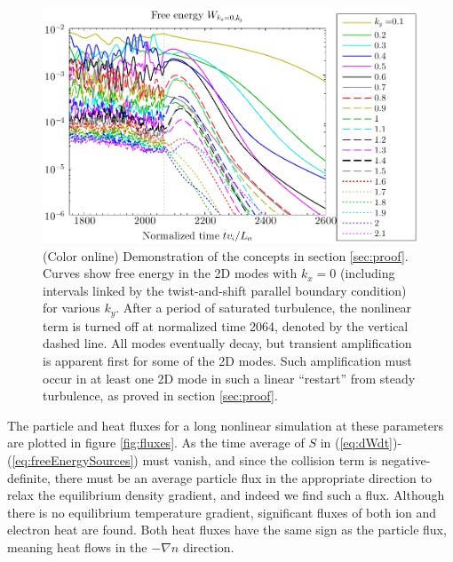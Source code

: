 \documentclass[12pt,superscriptaddress]{revtex4}
\begin{document}
\begin{figure}[h!]
\includegraphics[width=6.5in]{m20141126_02_plotWVsTimeForPaper_linearRestart.pdf}
\caption{(Color online)
Demonstration of the concepts in section \ref{sec:proof}.
Curves show free energy in the 2D modes with $k_x=0$ (including intervals linked by
the twist-and-shift parallel boundary condition) for various $k_y$.
After a period of saturated turbulence, the nonlinear term is turned off at normalized
time 2064, denoted by the vertical dashed line.
All modes eventually decay, but transient amplification is apparent first
for some of the 2D modes. Such amplification must occur in at least one 2D mode in such a linear ``restart'' from
steady turbulence, as proved in section \ref{sec:proof}.
\label{fig:linearRestart}}
\end{figure}

The particle and heat fluxes for a long nonlinear simulation at these parameters are plotted in figure \ref{fig:fluxes}.
As the time average of $S$ in (\ref{eq:dWdt})-(\ref{eq:freeEnergySources}) must vanish, and since the collision term
is negative-definite, there must be an average particle flux in the appropriate direction
to relax the equilibrium density gradient, and indeed we find such a flux.
Although there is no equilibrium temperature gradient, significant fluxes
of both ion and electron heat are found.  Both heat fluxes have the same sign
as the particle flux, meaning heat flows in the $-\nabla n$ direction.
\end{document}
